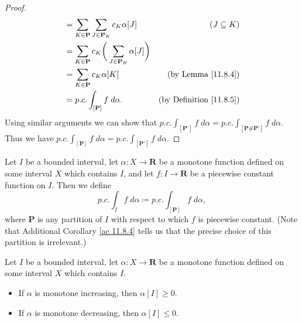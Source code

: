 \begin{proof}
\begin{align*}
                                                              & = \sum_{K \in \mathbf{P}} \sum_{J \in \mathbf{P}_K} c_K \alpha[J]             & (J \subseteq K)                         \\
                                                              & = \sum_{K \in \mathbf{P}} c_K \bigg(\sum_{J \in \mathbf{P}_K} \alpha[J]\bigg)                                           \\
                                                              & = \sum_{K \in \mathbf{P}} c_K \alpha[K]                                       & \text{(by Lemma \ref{11.8.4})}          \\
                                                              & = p.c. \int_{[\mathbf{P}]} f \; d \alpha.                                     & \text{(by Definition \ref{11.8.5})}
    \end{align*}
    Using similar arguments we can show that \(p.c. \int_{[\mathbf{P}']} f \; d \alpha = p.c. \int_{[\mathbf{P} \# \mathbf{P}']} f \; d \alpha\).
    Thus we have \(p.c. \int_{[\mathbf{P}]} f \; d \alpha = p.c. \int_{[\mathbf{P}']} f \; d \alpha\).
\end{proof}

\begin{additional corollary}\label{ac 11.8.5}
Let \(I\) be a bounded interval, let \(\alpha : X \to \mathbf{R}\) be a monotone function defined on some interval \(X\) which contains \(I\), and let \(f : I \to \mathbf{R}\) be a piecewise constant function on \(I\).
Then we define
\[
    p.c. \int_I f \; d \alpha \coloneqq p.c. \int_{[\mathbf{P}]} f \; d \alpha,
\]
where \(\mathbf{P}\) is any partition of \(I\) with respect to which \(f\) is piecewise constant.
(Note that Additional Corollary \ref{ac 11.8.4} tells us that the precise choice of this partition is irrelevant.)
\end{additional corollary}

\begin{additional corollary}\label{ac 11.8.6}
Let \(I\) be a bounded interval, let \(\alpha : X \to \mathbf{R}\) be a monotone function defined on some interval \(X\) which contains \(I\).
\begin{itemize}
    \item If \(\alpha\) is monotone increasing, then \(\alpha[I] \geq 0\).
    \item If \(\alpha\) is monotone decreasing, then \(\alpha[I] \leq 0\).
\end{itemize}
\end{additional corollary}

